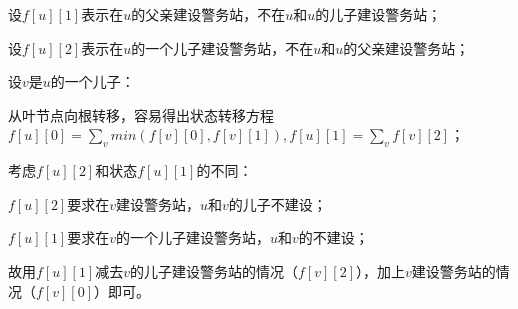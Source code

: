 \documentclass{article}
\begin{document}
    设\(f[u][1]\)表示在\(u\)的父亲建设警务站，不在\(u\)和\(u\)的儿子建设警务站；

    设\(f[u][2]\)表示在\(u\)的一个儿子建设警务站，不在\(u\)和\(u\)的父亲建设警务站；

    设\(v\)是\(u\)的一个儿子：

    从叶节点向根转移，容易得出状态转移方程\(f[u][0]=\sum_v min(f[v][0],f[v][1]),f[u][1]=\sum_v f[v][2]\)；

    考虑\(f[u][2]\)和状态\(f[u][1]\)的不同：

    \(f[u][2]\)要求在\(v\)建设警务站，\(u\)和\(v\)的儿子不建设；

    \(f[u][1]\)要求在\(v\)的一个儿子建设警务站，\(u\)和\(v\)的不建设；

    故用\(f[u][1]\)减去\(v\)的儿子建设警务站的情况（\(f[v][2]\)），加上\(v\)建设警务站的情况（\(f[v][0]\)）即可。
\end{document}
